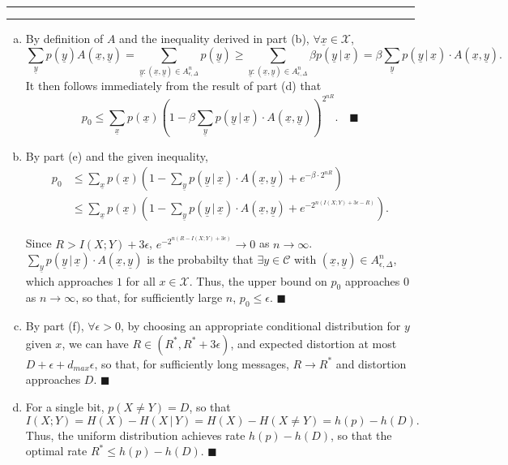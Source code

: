 \documentclass[11pt]{article}
\newcounter{questionCounter}
\newcounter{partCounter}[questionCounter]
\newenvironment{question}[2][\arabic{questionCounter}]{%
    \setcounter{partCounter}{0}%
    \vspace{.25in} \hrule \vspace{0.5em}%
        \noindent{\bf #2}%
    \vspace{0.8em} \hrule \vspace{.10in}%
    \addtocounter{questionCounter}{1}%
}{}
\renewcommand{\qed}{\quad $\blacksquare$}
\newcommand{\mqed}{\quad \blacksquare}
\newcommand{\ul}{\underline}
\newcommand{\X}{\mathcal{X}}
\newcommand{\pr}[1]{\mathsf{Pr}\left( #1 \right)} %
\newcommand{\giv}{\, | \,} %
\newcommand{\jtA}{A_{\epsilon,\Delta}^n} %
\begin{document}
\begin{question}{Problem 3}
\begin{enumerate}[(a)]
\item By definition of $A$ and the inequality derived in part (b), $\forall
\ul x \in \X$,
\[\sum_{\underline y} p(\ul y) A(\ul x, \ul y)
 = \sum_{\underline y : (\ul x, \ul y) \in \jtA} p(\ul y)
 \geq \sum_{\underline y : (\ul x, \ul y) \in \jtA} \beta p(\ul y \giv \ul x)
 = \beta \sum_{\underline y} p(\ul y \giv \ul x) \cdot A(\ul x, \ul y).
\]
It then follows immediately from the result of part (d) that
\[p_0
 \leq \sum_{\ul x} p(\ul x)
     \left(
        1 - \beta \sum_{\underline y} p(\ul y \giv \ul x) \cdot A(\ul x,\ul y)
    \right)^{2^{nR}}. \mqed
\]

\item 
By part (e) and the given inequality, 
\begin{align*}
p_0
 & \leq \sum_{\ul x} p(\ul x) 
    \left(1 - \sum_{\underline y} p(\ul y \giv \ul x) \cdot A(\ul x,\ul y)
     + e^{-\beta \cdot 2^{nR}}\right) \\
 & \leq \sum_{\ul x} p(\ul x)
    \left(1 - \sum_{\underline y} p(\ul y \giv \ul x) \cdot A(\ul x,\ul y)
     + e^{-2^{n(I(X;Y) + 3\epsilon - R)}}\right).
\end{align*}

Since $R > I(X;Y) + 3\epsilon$, $e^{-2^{n(R - I(X;Y) + 3\epsilon)}}
\rightarrow 0$ as $n \rightarrow \infty$. 
$\sum_{\underline y} p(\ul y \giv \ul x) \cdot A(\ul x,\ul y)$ is the
probabilty that $\exists y \in \mathcal{C}$ with $(\ul x, \ul y) \in \jtA$,
which approaches $1$ for all $x \in \X$. Thus, the upper bound on $p_0$
approaches $0$ as $n \rightarrow \infty$, so that, for sufficiently large $n$,
$p_0 \leq \epsilon$. \qed

\item
By part (f), $\forall \epsilon > 0$, by choosing an appropriate conditional
distribution for $y$ given $x$, we can have $R \in (R^*, R^* + 3\epsilon)$, and
expected distortion at most $D + \epsilon + d_{max} \epsilon$, so that, for
sufficiently long messages, $R \rightarrow R^*$ and distortion approaches $D$.
\qed

\item
For a single bit, $p(X \neq Y) = D$, so that
\[I(X;Y) = H(X) - H(X \giv Y) = H(X) - H(X \neq Y) = h(p) - h(D).\]
Thus, the uniform distribution achieves rate $h(p) - h(D)$, so that the optimal
rate $R^* \leq h(p) - h(D)$. \qed

\end{enumerate}
\end{question}
\end{document}
